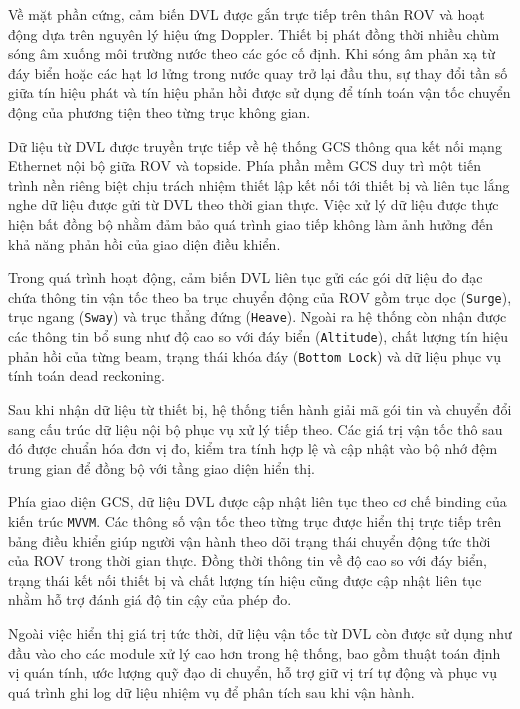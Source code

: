 \documentclass[../DoAn.tex]{subfiles}
\begin{document}
Về mặt phần cứng, cảm biến DVL được gắn trực tiếp trên thân ROV và hoạt động dựa trên nguyên lý hiệu ứng Doppler. Thiết bị phát đồng thời nhiều chùm sóng âm xuống môi trường nước theo các góc cố định. Khi sóng âm phản xạ từ đáy biển hoặc các hạt lơ lửng trong nước quay trở lại đầu thu, sự thay đổi tần số giữa tín hiệu phát và tín hiệu phản hồi được sử dụng để tính toán vận tốc chuyển động của phương tiện theo từng trục không gian.

Dữ liệu từ DVL được truyền trực tiếp về hệ thống GCS thông qua kết nối mạng Ethernet nội bộ giữa ROV và topside. Phía phần mềm GCS duy trì một tiến trình nền riêng biệt chịu trách nhiệm thiết lập kết nối tới thiết bị và liên tục lắng nghe dữ liệu được gửi từ DVL theo thời gian thực. Việc xử lý dữ liệu được thực hiện bất đồng bộ nhằm đảm bảo quá trình giao tiếp không làm ảnh hưởng đến khả năng phản hồi của giao diện điều khiển.

Trong quá trình hoạt động, cảm biến DVL liên tục gửi các gói dữ liệu đo đạc chứa thông tin vận tốc theo ba trục chuyển động của ROV gồm trục dọc (\texttt{Surge}), trục ngang (\texttt{Sway}) và trục thẳng đứng (\texttt{Heave}). Ngoài ra hệ thống còn nhận được các thông tin bổ sung như độ cao so với đáy biển (\texttt{Altitude}), chất lượng tín hiệu phản hồi của từng beam, trạng thái khóa đáy (\texttt{Bottom Lock}) và dữ liệu phục vụ tính toán dead reckoning.

Sau khi nhận dữ liệu từ thiết bị, hệ thống tiến hành giải mã gói tin và chuyển đổi sang cấu trúc dữ liệu nội bộ phục vụ xử lý tiếp theo. Các giá trị vận tốc thô sau đó được chuẩn hóa đơn vị đo, kiểm tra tính hợp lệ và cập nhật vào bộ nhớ đệm trung gian để đồng bộ với tầng giao diện hiển thị.

Phía giao diện GCS, dữ liệu DVL được cập nhật liên tục theo cơ chế binding của kiến trúc \texttt{MVVM}. Các thông số vận tốc theo từng trục được hiển thị trực tiếp trên bảng điều khiển giúp người vận hành theo dõi trạng thái chuyển động tức thời của ROV trong thời gian thực. Đồng thời thông tin về độ cao so với đáy biển, trạng thái kết nối thiết bị và chất lượng tín hiệu cũng được cập nhật liên tục nhằm hỗ trợ đánh giá độ tin cậy của phép đo.

Ngoài việc hiển thị giá trị tức thời, dữ liệu vận tốc từ DVL còn được sử dụng như đầu vào cho các module xử lý cao hơn trong hệ thống, bao gồm thuật toán định vị quán tính, ước lượng quỹ đạo di chuyển, hỗ trợ giữ vị trí tự động và phục vụ quá trình ghi log dữ liệu nhiệm vụ để phân tích sau khi vận hành.
\end{document}
